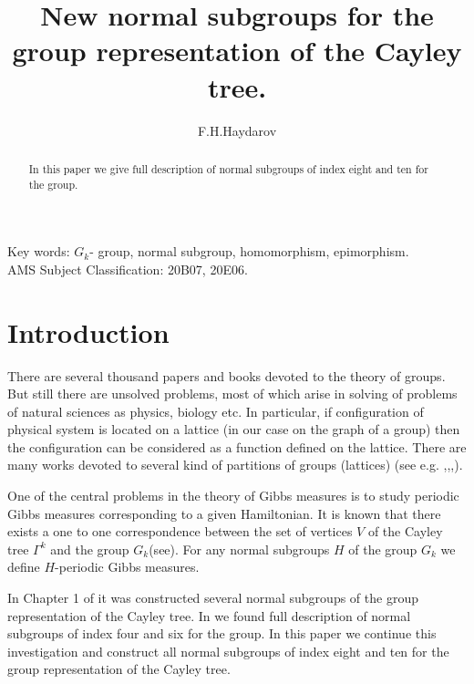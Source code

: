 \documentclass[12pt,reqno]{amsart}
\numberwithin{equation}{section}
\begin{document}
\title[Normal subgroups]{New normal subgroups for the group representation of the Cayley tree.}

\author{F.H.Haydarov}
 \address{F.H.Haydarov\\ National University of Uzbekistan,
Tashkent, Uzbekistan.}

\begin{abstract}
In this paper we give full description of normal subgroups of
index eight and ten for the group.
\end{abstract}

\maketitle

{Key words:} $G_{k}$- group, normal subgroup, homomorphism,
epimorphism.\\

AMS Subject Classification: 20B07, 20E06.

\section{Introduction}

 There are several thousand papers and books devoted
 to the theory of groups. But still there are unsolved
 problems, most of which arise in solving of problems of
  natural sciences as physics, biology etc.
 In particular, if configuration of physical system is
 located on a lattice (in our case on the graph of a group)
 then the configuration can be considered as a function defined on
 the lattice. There are many works devoted to several kind of
 partitions of groups (lattices) (see e.g. \cite{1},\cite{3},\cite{5},\cite{7}).

One of the central problems in the theory of Gibbs measures is to
study periodic Gibbs measures corresponding to a given
Hamiltonian. It is known that there exists a one to one
correspondence between the set of vertices $V$ of the Cayley tree
$\Gamma^{k}$ and the group $G_{k}$(see\cite{5}). For any normal
subgroups $H$ of the group $G_{k}$ we define $H$-periodic Gibbs
measures.

 In Chapter 1 of \cite{5} it was constructed several normal subgroups of
the group representation of the Cayley tree. In \cite{4} we found
full description of normal subgroups of index four and six for the
group. In this paper we continue this investigation and construct
all normal subgroups of index eight and ten for the group representation of the Cayley tree.\\
\end{document}
